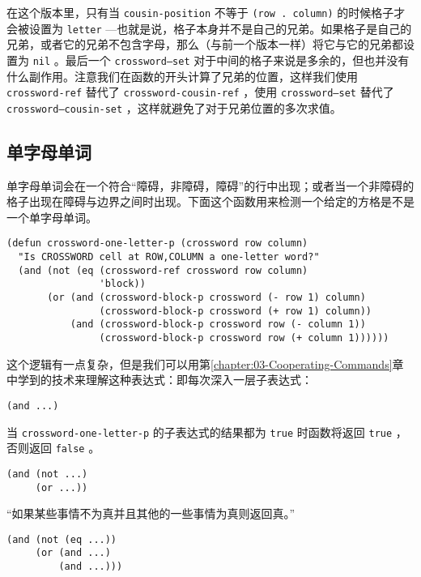 在这个版本里，只有当 \texttt{cousin-position} 不等于 \texttt{(row . column)} 的时候格子才会被设置为 \texttt{letter} ---也就是说，格子本身并不是自己的兄弟。如果格子是自己的兄弟，或者它的兄弟不包含字母，那么（与前一个版本一样）将它与它的兄弟都设置为 \texttt{nil} 。最后一个 \texttt{crossword--set} 对于中间的格子来说是多余的，但也并没有什么副作用。注意我们在函数的开头计算了兄弟的位置，这样我们使用 \texttt{crossword-ref} 替代了 \texttt{crossword-cousin-ref} ，使用 \texttt{crossword--set} 替代了 \texttt{crossword--cousin-set} ，这样就避免了对于兄弟位置的多次求值。

\subsection{单字母单词}
\label{section:10-One-Letter-Words}

单字母单词会在一个符合“障碍，非障碍，障碍”的行中出现；或者当一个非障碍的格子出现在障碍与边界之间时出现。下面这个函数用来检测一个给定的方格是不是一个单字母单词。

\begin{verbatim}
(defun crossword-one-letter-p (crossword row column)
  "Is CROSSWORD cell at ROW,COLUMN a one-letter word?"
  (and (not (eq (crossword-ref crossword row column)
                'block))
       (or (and (crossword-block-p crossword (- row 1) column)
                (crossword-block-p crossword (+ row 1) column))
           (and (crossword-block-p crossword row (- column 1))
                (crossword-block-p crossword row (+ column 1))))))
\end{verbatim}

这个逻辑有一点复杂，但是我们可以用第\ref{chapter:03-Cooperating-Commands}章中学到的技术来理解这种表达式：即每次深入一层子表达式：

\begin{verbatim}
(and ...)
\end{verbatim}

当 \texttt{crossword-one-letter-p} 的子表达式的结果都为 \texttt{true} 时函数将返回 \texttt{true} ，否则返回 \texttt{false} 。

\begin{verbatim}
(and (not ...)
     (or ...))
\end{verbatim}

“如果某些事情不为真并且其他的一些事情为真则返回真。”

\begin{verbatim}
(and (not (eq ...))
     (or (and ...)
         (and ...)))
\end{verbatim}

